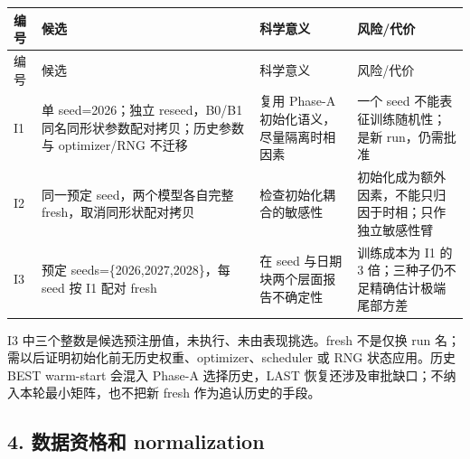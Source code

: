\documentclass[UTF8,fontset=fandol,10pt]{ctexart}
\begin{document}
\begingroup\small\setlength{\tabcolsep}{3pt}\renewcommand{\arraystretch}{1.12}
\begin{longtable}{>{\raggedright\arraybackslash}p{\dimexpr(\linewidth-8\tabcolsep)/4\relax}>{\raggedright\arraybackslash}p{\dimexpr(\linewidth-8\tabcolsep)/4\relax}>{\raggedright\arraybackslash}p{\dimexpr(\linewidth-8\tabcolsep)/4\relax}>{\raggedright\arraybackslash}p{\dimexpr(\linewidth-8\tabcolsep)/4\relax}}
\toprule
编号 & 候选 & 科学意义 & 风险/\allowbreak{}代价 \\
\midrule\endfirsthead
编号 & 候选 & 科学意义 & 风险/\allowbreak{}代价 \\
\midrule\endhead
I1 & 单 seed=2026；独立 reseed，B0/\allowbreak{}B1 同名同形状参数配对拷贝；历史参数与 optimizer/\allowbreak{}RNG 不迁移 & 复用 Phase-A 初始化语义，尽量隔离时相因素 & 一个 seed 不能表征训练随机性；是新 run，仍需批准 \\
I2 & 同一预定 seed，两个模型各自完整 fresh，取消同形状配对拷贝 & 检查初始化耦合的敏感性 & 初始化成为额外因素，不能只归因于时相；只作独立敏感性臂 \\
I3 & 预定 seeds=\{2026,2027,2028\}，每 seed 按 I1 配对 fresh & 在 seed 与日期块两个层面报告不确定性 & 训练成本为 I1 的 3 倍；三种子仍不足精确估计极端尾部方差 \\
\bottomrule\end{longtable}\endgroup

I3 中三个整数是候选预注册值，未执行、未由表现挑选。fresh 不是仅换 run 名；需以后证明初始化前无历史权重、optimizer、scheduler 或 RNG 状态应用。历史 BEST warm-start 会混入 Phase-A 选择历史，LAST 恢复还涉及审批缺口；不纳入本轮最小矩阵，也不把新 fresh 作为追认历史的手段。

\subsection{4. 数据资格和 normalization}
\end{document}
